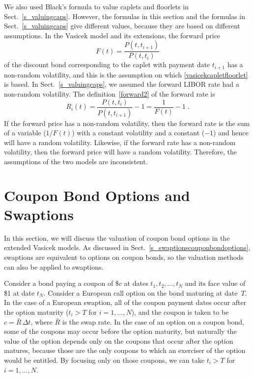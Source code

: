 We also used Black's formula to value caplets and floorlets in Sect.~\ref{s_valuingcaps}.  However, the formulas in this section and the formulas in Sect.~\ref{s_valuingcaps} give different values, because they are based on different assumptions.  In the Vasicek model and its extensions, the forward price 
$$F(t) = \frac{P(t,t_{i+1})}{P(t,t_i)}$$
of the discount bond corresponding to the caplet with payment date $t_{i+1}$ has a non-random volatility, and this is the assumption on which  \eqref{vasicekcapletfloorlet} is based.  In Sect.~\ref{s_valuingcaps}, we assumed the forward LIBOR rate had a non-random volatility.  The definition~\eqref{forward2} of the forward rate is
$$R_i(t) = \frac{P(t,t_i)}{P(t,t_{i+1})} - 1 = \frac{1}{F(t)}-1\; .$$
If the forward price has a non-random volatility, then the forward rate is the sum of a variable ($1/F(t)$) with a constant volatility and a constant ($-1$) and hence will have a random volatility.  Likewise, if the forward rate has a non-random volatility, then the forward price will have a random volatility.  Therefore, the assumptions of the two models are inconsistent.



\section{Coupon Bond Options and Swaptions}\label{s_vasicek_swaptions}

In this section, we will discuss the valuation of coupon bond options in the extended Vasicek models.  As discussed in Sect.~\ref{s_swaptionscouponbondoptions}, swaptions  are equivalent to options on coupon bonds, so the valuation methods can also be applied to swaptions.

Consider a bond paying a coupon of \$$c$ at dates $t_1, t_2, \ldots, t_N$ and its face value of \$1 at date $t_N$.  Consider a European call option on the bond maturing at date~$T$.  In the case of a European swaption, all of the coupon payment dates occur after the option maturity ($t_i > T$ for $i=1,\ldots,N$), and the coupon is taken to be $c=\bar{R}\,\varDelta t$, where $\bar{R}$ is the swap rate.  In the case of an option on a coupon bond, some of the coupons may occur before the option maturity, but naturally the value of the option depends only on the coupons that occur after the option matures, because those are the only coupons to which an exerciser of the option would be entitled.  By focusing only on those coupons, we can take $t_i > T$ for $i=1,\ldots,N$.



